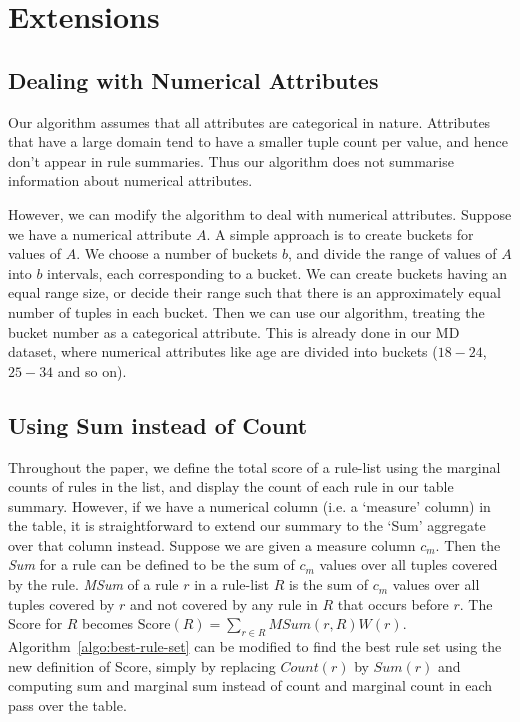 

\section{Extensions}\label{sec:extensions}
\subsection{Dealing with Numerical Attributes}\label{sec:extensions-numerical}
Our algorithm assumes that all attributes are categorical in nature. Attributes that have a large domain tend to have a smaller tuple count per value, and hence don't appear in rule summaries. Thus our algorithm does not summarise information about numerical attributes. 

However, we can modify the algorithm to deal with numerical attributes. Suppose we have a numerical attribute $A$. A simple approach is to create buckets for values of $A$. We choose a number of buckets $b$, and divide the range of values of $A$ into $b$ intervals, each corresponding to a bucket. We can create buckets having an equal range size, or decide their range such that there is an approximately equal number of tuples in each bucket. Then we can use our algorithm, treating the bucket number as a categorical attribute. This is already done in our MD dataset, where numerical attributes like age are divided into buckets ($18-24$, $25-34$ and so on).

\subsection{Using Sum instead of Count}\label{sec:extensions-sum}
Throughout the paper, we define the total score of a rule-list using the marginal counts of rules in the list, and display the count of each rule in our table summary. However, if we have a numerical column (i.e. a `measure' column) in the table, it is straightforward to extend our summary to the `Sum' aggregate over that column instead. Suppose we are given a measure column $c_m$. Then the {\em Sum} for a rule can be defined to be the sum of $c_m$ values over all tuples covered by the rule. {\em MSum} of a rule $r$ in a rule-list $R$ is the sum of $c_m$ values over all tuples covered by $r$ and not covered by any rule in $R$ that occurs before $r$. The Score for $R$ becomes $\text{Score}(R) = \sum_{r\in R} MSum(r,R)W(r)$. Algorithm~\ref{algo:best-rule-set} can be modified to find the best rule set using the new definition of Score, simply by replacing $Count(r)$ by $Sum(r)$ and computing sum and marginal sum instead of count and marginal count in each pass over the table.